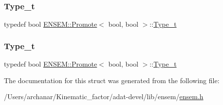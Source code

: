 \subsubsection{\texorpdfstring{Type\_t}{Type\_t}\hspace{0.1cm}{\footnotesize\ttfamily [2/3]}}
{\footnotesize\ttfamily typedef bool \mbox{\hyperlink{structENSEM_1_1Promote}{E\+N\+S\+E\+M\+::\+Promote}}$<$ bool, bool $>$\+::\mbox{\hyperlink{structENSEM_1_1Promote_3_01bool_00_01bool_01_4_a5838c93b09205ae2ab83138d0d4c02e4}{Type\+\_\+t}}}

\mbox{\label{structENSEM_1_1Promote_3_01bool_00_01bool_01_4_a5838c93b09205ae2ab83138d0d4c02e4}} 
\subsubsection{\texorpdfstring{Type\_t}{Type\_t}\hspace{0.1cm}{\footnotesize\ttfamily [3/3]}}
{\footnotesize\ttfamily typedef bool \mbox{\hyperlink{structENSEM_1_1Promote}{E\+N\+S\+E\+M\+::\+Promote}}$<$ bool, bool $>$\+::\mbox{\hyperlink{structENSEM_1_1Promote_3_01bool_00_01bool_01_4_a5838c93b09205ae2ab83138d0d4c02e4}{Type\+\_\+t}}}



The documentation for this struct was generated from the following file\+:\begin{DoxyCompactItemize}
\item 
/\+Users/archanar/\+Kinematic\+\_\+factor/adat-\/devel/lib/ensem/\mbox{\hyperlink{adat-devel_2lib_2ensem_2ensem_8h}{ensem.\+h}}\end{DoxyCompactItemize}
